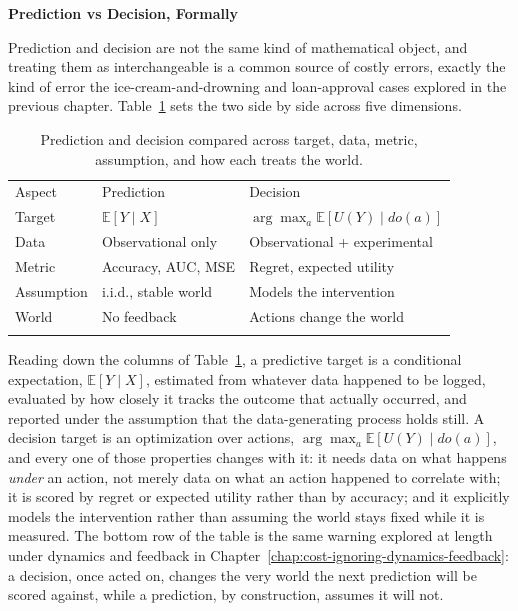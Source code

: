 \textbf{Prediction vs Decision, Formally}

Prediction and decision are not the same kind of mathematical object, and treating them as interchangeable is a common source of costly errors, exactly the kind of error the ice-cream-and-drowning and loan-approval cases explored in the previous chapter. Table~\ref{tab:prediction-vs-decision-formally} sets the two side by side across five dimensions.

\begin{table}[!t]
\caption{Prediction and decision compared across target, data, metric, assumption, and how each treats the world.}
\label{tab:prediction-vs-decision-formally}
\begin{tabular}{p{2.0cm}p{4.5cm}p{4.8cm}}
\hline\noalign{\smallskip}
Aspect & Prediction & Decision \\
\noalign{\smallskip}\svhline\noalign{\smallskip}
Target & $\mathbb{E}[Y \mid X]$ & $\arg\max_a \mathbb{E}[U(Y) \mid do(a)]$ \\
Data & Observational only & Observational + experimental \\
Metric & Accuracy, AUC, MSE & Regret, expected utility \\
Assumption & i.i.d., stable world & Models the intervention \\
World & No feedback & Actions change the world \\
\noalign{\smallskip}\hline\noalign{\smallskip}
\end{tabular}
\end{table}

Reading down the columns of Table~\ref{tab:prediction-vs-decision-formally}, a predictive target is a conditional expectation, $\mathbb{E}[Y \mid X]$, estimated from whatever data happened to be logged, evaluated by how closely it tracks the outcome that actually occurred, and reported under the assumption that the data-generating process holds still. A decision target is an optimization over actions, $\arg\max_a \mathbb{E}[U(Y) \mid do(a)]$, and every one of those properties changes with it: it needs data on what happens \emph{under} an action, not merely data on what an action happened to correlate with; it is scored by regret or expected utility rather than by accuracy; and it explicitly models the intervention rather than assuming the world stays fixed while it is measured. The bottom row of the table is the same warning explored at length under dynamics and feedback in Chapter~\ref{chap:cost-ignoring-dynamics-feedback}: a decision, once acted on, changes the very world the next prediction will be scored against, while a prediction, by construction, assumes it will not.

